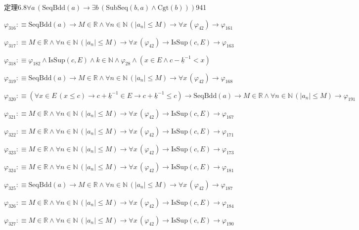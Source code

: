 \begin{fullproof}{定理6.8}{$\forall a\,(\mathrm{SeqBdd}(a) \to \exists b\,(\mathrm{SubSeq}(b,a) \land \mathrm{Cgt}(b)))$}{941}
\begin{abbrevlist}
\item $\varphi_{316} :\equiv \mathrm{SeqBdd}(a) \to M \in \mathbb{R} \land \forall n \in \mathbb{N}\,(\lvert a_{n} \rvert \leq M) \to \forall x\,(\varphi_{42}) \to \varphi_{161}$
\item $\varphi_{317} :\equiv M \in \mathbb{R} \land \forall n \in \mathbb{N}\,(\lvert a_{n} \rvert \leq M) \to \forall x\,(\varphi_{42}) \to \mathrm{IsSup}(c,E) \to \varphi_{163}$
\item $\varphi_{318} :\equiv \varphi_{182} \land \mathrm{IsSup}(c,E) \land k \in \mathbb{N} \land \varphi_{28} \land (x \in E \land c - \underline{k}^{-1} < x)$
\item $\varphi_{319} :\equiv \mathrm{SeqBdd}(a) \to M \in \mathbb{R} \land \forall n \in \mathbb{N}\,(\lvert a_{n} \rvert \leq M) \to \forall x\,(\varphi_{42}) \to \varphi_{168}$
\item $\varphi_{320} :\equiv (\forall x \in E\,(x \leq c) \to c + \underline{k}^{-1} \in E \to c + \underline{k}^{-1} \leq c) \to \mathrm{SeqBdd}(a) \to M \in \mathbb{R} \land \forall n \in \mathbb{N}\,(\lvert a_{n} \rvert \leq M) \to \varphi_{191}$
\item $\varphi_{321} :\equiv M \in \mathbb{R} \land \forall n \in \mathbb{N}\,(\lvert a_{n} \rvert \leq M) \to \forall x\,(\varphi_{42}) \to \mathrm{IsSup}(c,E) \to \varphi_{167}$
\item $\varphi_{322} :\equiv M \in \mathbb{R} \land \forall n \in \mathbb{N}\,(\lvert a_{n} \rvert \leq M) \to \forall x\,(\varphi_{42}) \to \mathrm{IsSup}(c,E) \to \varphi_{171}$
\item $\varphi_{323} :\equiv M \in \mathbb{R} \land \forall n \in \mathbb{N}\,(\lvert a_{n} \rvert \leq M) \to \forall x\,(\varphi_{42}) \to \mathrm{IsSup}(c,E) \to \varphi_{173}$
\item $\varphi_{324} :\equiv M \in \mathbb{R} \land \forall n \in \mathbb{N}\,(\lvert a_{n} \rvert \leq M) \to \forall x\,(\varphi_{42}) \to \mathrm{IsSup}(c,E) \to \varphi_{181}$
\item $\varphi_{325} :\equiv \mathrm{SeqBdd}(a) \to M \in \mathbb{R} \land \forall n \in \mathbb{N}\,(\lvert a_{n} \rvert \leq M) \to \forall x\,(\varphi_{42}) \to \varphi_{187}$
\item $\varphi_{326} :\equiv M \in \mathbb{R} \land \forall n \in \mathbb{N}\,(\lvert a_{n} \rvert \leq M) \to \forall x\,(\varphi_{42}) \to \mathrm{IsSup}(c,E) \to \varphi_{184}$
\item $\varphi_{327} :\equiv M \in \mathbb{R} \land \forall n \in \mathbb{N}\,(\lvert a_{n} \rvert \leq M) \to \forall x\,(\varphi_{42}) \to \mathrm{IsSup}(c,E) \to \varphi_{190}$

\end{abbrevlist}
\end{fullproof}
